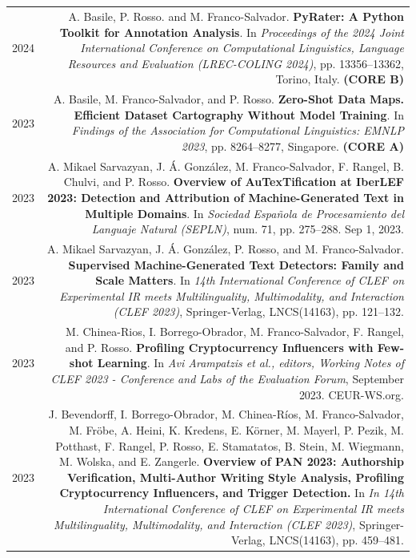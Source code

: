 \documentclass[10pt]{article}
\begin{document}
\section*{}
\begin{tabular}{L!{\VRule}R}
    2024 & A. Basile, P. Rosso. and M. Franco-Salvador. \textbf{PyRater: A Python Toolkit for Annotation Analysis}. In \emph{Proceedings of the 2024 Joint International Conference on Computational Linguistics, Language Resources and Evaluation (LREC-COLING 2024)}, pp. 13356–13362, Torino, Italy. \textbf{(CORE B)}  \vspace{5pt}\\
    2023 & A. Basile, M. Franco-Salvador, and P. Rosso. \textbf{Zero-Shot Data Maps. Efficient Dataset Cartography Without Model Training}. In \emph{Findings of the Association for Computational Linguistics: EMNLP 2023}, pp. 8264–8277, Singapore. \textbf{(CORE A)}  \vspace{5pt}\\
    2023 & A. Mikael Sarvazyan, J. Á. González, M. Franco-Salvador, F. Rangel, B. Chulvi, and P. Rosso. \textbf{Overview of AuTexTification at IberLEF 2023: Detection and Attribution of Machine-Generated Text in Multiple Domains}. In \emph{Sociedad Española de Procesamiento del Languaje Natural (SEPLN)}, num. 71, pp. 275--288. Sep 1, 2023. \vspace{5pt}\\
    2023 & A. Mikael Sarvazyan, J. Á. González, P. Rosso, and M. Franco-Salvador. \textbf{Supervised Machine-Generated Text Detectors: Family and Scale Matters}. In \emph{14th International Conference of CLEF on Experimental IR meets Multilinguality, Multimodality, and Interaction (CLEF 2023)}, Springer-Verlag, LNCS(14163), pp. 121--132. \vspace{5pt}\\
    2023 &  M. Chinea-Rios, I. Borrego-Obrador, M. Franco-Salvador, F. Rangel, and P. Rosso. \textbf{Profiling Cryptocurrency Influencers with Few-shot Learning}. In \emph{Avi Arampatzis et al., editors, Working Notes of CLEF 2023 - Conference and Labs of the Evaluation Forum}, September 2023. CEUR-WS.org. \vspace{5pt}\\
    2023 & J. Bevendorff, I. Borrego-Obrador, M. Chinea-Ríos, M. Franco-Salvador, M. Fröbe, A. Heini, K. Kredens, E. Körner, M. Mayerl, P. Pezik, M. Potthast, F. Rangel, P. Rosso, E. Stamatatos, B. Stein, M. Wiegmann, M. Wolska, and E. Zangerle. \textbf{Overview of PAN 2023: Authorship Verification, Multi-Author Writing Style Analysis, Profiling Cryptocurrency Influencers, and Trigger Detection.} In \emph{In 14th International Conference of CLEF on Experimental IR meets Multilinguality, Multimodality, and Interaction (CLEF 2023)}, Springer-Verlag, LNCS(14163), pp. 459--481. \vspace{5pt}\\

\end{tabular}
\end{document}

